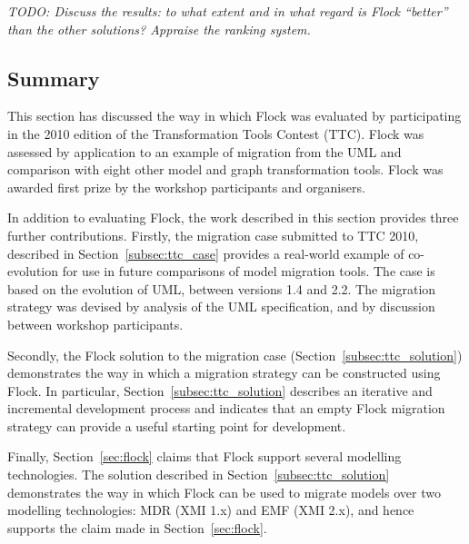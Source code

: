 \emph{TODO: Discuss the results: to what extent and in what regard is Flock ``better'' than the other solutions? Appraise the ranking system.}


\subsection{Summary}
This section has discussed the way in which Flock was evaluated by participating in the 2010 edition of the Transformation Tools Contest (TTC). Flock was assessed by application to an example of migration from the UML and comparison with eight other model and graph transformation tools. Flock was awarded first prize by the workshop participants and organisers. 

In addition to evaluating Flock, the work described in this section provides three further contributions. Firstly, the migration case submitted to TTC 2010, described in Section~\ref{subsec:ttc_case} provides a real-world example of co-evolution for use in future comparisons of model migration tools. The case is based on the evolution of UML, between versions 1.4 and 2.2. The migration strategy was devised by analysis of the UML specification, and by discussion between workshop participants.

Secondly, the Flock solution to the migration case (Section~\ref{subsec:ttc_solution}) demonstrates the way in which a migration strategy can be constructed using Flock. In particular, Section~\ref{subsec:ttc_solution} describes an iterative and incremental development process and indicates that an empty Flock migration strategy can provide a useful starting point for development.

Finally, Section~\ref{sec:flock} claims that Flock support several modelling technologies. The solution described in Section~\ref{subsec:ttc_solution} demonstrates the way in which Flock can be used to migrate models over two modelling technologies: MDR (XMI 1.x) and EMF (XMI 2.x), and hence supports the claim made in Section~\ref{sec:flock}.